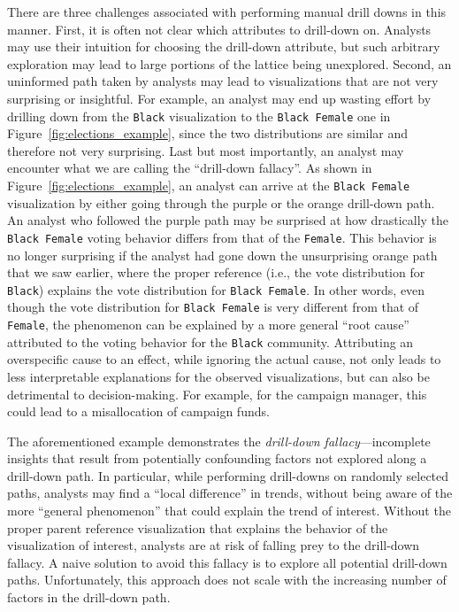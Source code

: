 \par There are three challenges associated with performing manual drill downs in this manner. First, it is often not clear which attributes to drill-down on. Analysts may use their intuition for choosing the drill-down attribute, but such arbitrary exploration may lead to large portions of the lattice being unexplored. Second, an uninformed path taken by analysts may lead to visualizations that are not very surprising or insightful. For example, an analyst may end up wasting effort by drilling down from the \texttt{Black} visualization to the \texttt{Black Female} one in Figure~\ref{fig:elections_example}, since the two distributions are similar and therefore not very surprising. Last but most importantly, an analyst may encounter what we are calling the ``drill-down fallacy''. As shown in Figure~\ref{fig:elections_example}, an analyst can arrive at the \texttt{Black Female} visualization by either going through the purple or the orange drill-down path. An analyst who followed the purple path may be surprised at how drastically the \texttt{Black Female} voting behavior differs from that of the \texttt{Female}. This behavior is no longer surprising if the analyst had gone down the unsurprising orange path that we saw earlier, where the proper reference (i.e., the vote distribution for \texttt{Black}) explains the vote distribution for \texttt{Black Female}. In other words, even though the vote distribution for \texttt{Black Female} is very different from that of \texttt{Female}, the phenomenon can be explained by a more general ``root cause'' attributed to the voting behavior for the \texttt{Black} community. Attributing an overspecific cause to an effect, while ignoring the actual cause, not only leads to less interpretable explanations for the observed visualizations, but can also be detrimental to decision-making. For example, for the campaign manager, this could lead to a misallocation of campaign funds.
\par The aforementioned example demonstrates the \emph{drill-down fallacy}---incomplete insights that result from potentially confounding factors not explored along a drill-down path. In particular, while performing drill-downs on randomly selected paths, analysts may find a ``local difference'' in trends, without being aware of the more ``general phenomenon'' that could explain the trend of interest. Without the proper parent reference visualization that explains the behavior of the visualization of interest, analysts are at risk of falling prey to the drill-down fallacy. A naive solution to avoid this fallacy is to explore all potential drill-down paths. Unfortunately, this approach does not scale with the increasing number of factors in the drill-down path.
